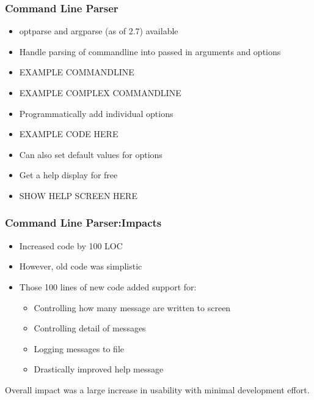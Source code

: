 \documentclass[red, hyperref={pdfpagelabels=false}]{beamer}
\begin{document}
\begin{frame}
  \frametitle{Command Line Parser}
  \begin{itemize}
    \item optparse and argparse (as of 2.7) available
    \item Handle parsing of commandline into passed in arguments and options
    \item EXAMPLE COMMANDLINE
    \item EXAMPLE COMPLEX COMMANDLINE
    \item Programmatically add individual options
    \item EXAMPLE CODE HERE
    \item Can also set default values for options
    \item Get a help display for free
    \item SHOW HELP SCREEN HERE
  \end{itemize}
\end{frame}

\begin{frame}
  \frametitle{Command Line Parser:Impacts}
  \begin{itemize}
    \item Increased code by 100 LOC
    \item However, old code was simplistic
    \item Those 100 lines of new code added support for:
    \begin{itemize}
      \item Controlling how many message are written to screen
      \item Controlling detail of messages
      \item Logging messages to file
      \item Drastically improved help message
    \end{itemize}
  \end{itemize}
  Overall impact was a large increase in usability with minimal development effort.
\end{frame}
\end{document}
